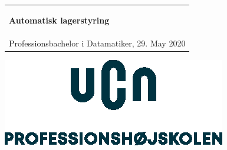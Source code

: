 %
\begin{titlepage}
\pagecolor{ucngrey}\afterpage{\nopagecolor}

\vspace*{\fill}

  \addtolength{\hoffset}{0.5\evensidemargin-0.5\oddsidemargin} %
  \noindent%
  {\color{white}\colorbox{ucnblue}{\begin{tabular}{@{}p{\textwidth}@{}}
    \begin{center}
    \Huge{\textbf{
      Automatisk lagerstyring%
    }}
    \end{center}
    \begin{center}
      \Large{
      }
    \end{center}
    \vspace{0.2cm}
   \begin{center}
    {\Large
      Benyad Jomhur, Lucca Christiansen, Mads Østermark, Mathias Olesen, Søren Ravn%
    }\\
    \vspace{0.2cm}
    {\large
    Professionsbachelor i Datamatiker, 29. May 2020%
    }
   \end{center}
   \vspace{0.2cm}
   \begin{center}
    {\Large
      Førsteårsprojekt
    }
   \end{center}
  \end{tabular}}}
  \vfill
  \begin{center}
    \includegraphics[width=0.2\paperwidth]{figures/formalities/UCN-hovedlogo}
  \end{center}
\end{titlepage}
\clearpage